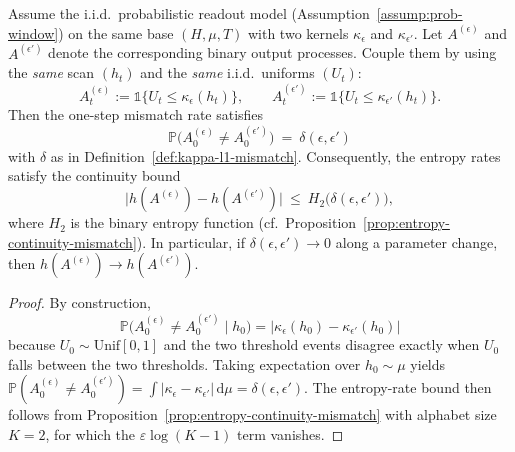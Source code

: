 \begin{proposition}\label{prop:h-continuity-kappa}
Assume the i.i.d.\ probabilistic readout model (Assumption~\ref{assump:prob-window}) on the same base \((H,\mu,T)\) with two kernels \(\kappa_\epsilon\) and \(\kappa_{\epsilon'}\).
Let \(A^{(\epsilon)}\) and \(A^{(\epsilon')}\) denote the corresponding binary output processes.
Couple them by using the \emph{same} scan \((h_t)\) and the \emph{same} i.i.d.\ uniforms \((U_t)\):
\[
A^{(\epsilon)}_t:=\mathds{1}\{U_t\le \kappa_\epsilon(h_t)\},\qquad
A^{(\epsilon')}_t:=\mathds{1}\{U_t\le \kappa_{\epsilon'}(h_t)\}.
\]
Then the one-step mismatch rate satisfies
\[
\mathbb{P}\bigl(A^{(\epsilon)}_0\neq A^{(\epsilon')}_0\bigr)\ =\ \delta(\epsilon,\epsilon')
\]
with \(\delta\) as in Definition~\ref{def:kappa-l1-mismatch}.
Consequently, the entropy rates satisfy the continuity bound
\[
\bigl|h(A^{(\epsilon)})-h(A^{(\epsilon')})\bigr|
\ \le\
H_2\!\bigl(\delta(\epsilon,\epsilon')\bigr),
\]
where \(H_2\) is the binary entropy function (cf.\ Proposition~\ref{prop:entropy-continuity-mismatch}).
In particular, if \(\delta(\epsilon,\epsilon')\to 0\) along a parameter change, then \(h(A^{(\epsilon)})\to h(A^{(\epsilon')})\).
\end{proposition}

\begin{proof}
By construction,
\[
\mathbb{P}\bigl(A^{(\epsilon)}_0\neq A^{(\epsilon')}_0\mid h_0\bigr)=\bigl|\kappa_\epsilon(h_0)-\kappa_{\epsilon'}(h_0)\bigr|
\]
because \(U_0\sim\mathrm{Unif}[0,1]\) and the two threshold events disagree exactly when \(U_0\) falls between the two thresholds.
Taking expectation over \(h_0\sim\mu\) yields \(\mathbb{P}(A^{(\epsilon)}_0\neq A^{(\epsilon')}_0)=\int|\kappa_\epsilon-\kappa_{\epsilon'}|\,\mathrm{d}\mu=\delta(\epsilon,\epsilon')\).
The entropy-rate bound then follows from Proposition~\ref{prop:entropy-continuity-mismatch} with alphabet size \(K=2\), for which the \(\varepsilon\log(K-1)\) term vanishes.
\end{proof}

